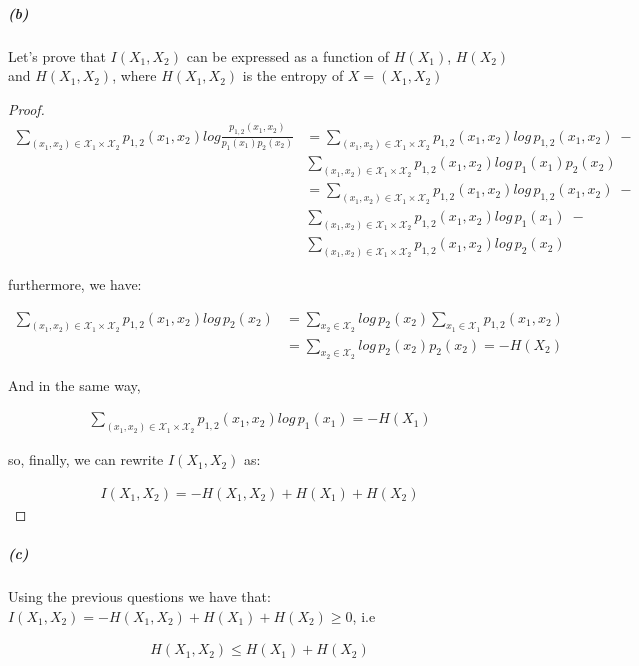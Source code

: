 \documentclass[11pt]{article}
\numberwithin{figure}{section} %
\begin{document}
\subparagraph{(b)}
Let's prove that $I(X_1, X_2)$ can be expressed as a function of $H(X_1)$, $H(X_2)$ and $H(X_1, X_2)$, where $H(X_1, X_2)$ is the entropy of $X = (X_1, X_2)$

\begin{proof}
\begin{align*}
\sum\limits_{(x_1,x_2) \in \mathcal{X}_1 \times \mathcal{X}_2} p_{1,2}(x_1,x_2) log \frac{p_{1,2}(x_1,x_2)}{p_1(x_1)p_2(x_2)} &=
\sum\limits_{(x_1,x_2) \in \mathcal{X}_1 \times \mathcal{X}_2} p_{1,2}(x_1,x_2) log \,p_{1,2}(x_1,x_2) \;- \\ 
&\sum\limits_{(x_1,x_2) \in \mathcal{X}_1 \times \mathcal{X}_2} p_{1,2}(x_1,x_2) log \,p_1(x_1)p_2(x_2) \\
&= \sum\limits_{(x_1,x_2) \in \mathcal{X}_1 \times \mathcal{X}_2} p_{1,2}(x_1,x_2) log \,p_{1,2}(x_1,x_2) \;- \\
&\sum\limits_{(x_1,x_2) \in \mathcal{X}_1 \times \mathcal{X}_2} p_{1,2}(x_1,x_2) log \,p_1(x_1) \;- \\
&\sum\limits_{(x_1,x_2) \in \mathcal{X}_1 \times \mathcal{X}_2} p_{1,2}(x_1,x_2) log \,p_2(x_2)
\end{align*}

furthermore, we have:

\begin{align*}
\sum\limits_{(x_1,x_2) \in \mathcal{X}_1 \times \mathcal{X}_2} p_{1,2}(x_1,x_2) log \,p_2(x_2) &= 
\sum\limits_{x_2 \in \mathcal{X}_2} log \,p_2(x_2) \sum\limits_{x_1 \in \mathcal{X}_1} p_{1,2}(x_1,x_2) \\
&= \sum\limits_{x_2 \in \mathcal{X}_2} log \,p_2(x_2) p_{2}(x_2) = -H(X_2)
\end{align*}

And in the same way,

\begin{align*}
\sum\limits_{(x_1,x_2) \in \mathcal{X}_1 \times \mathcal{X}_2} p_{1,2}(x_1,x_2) log \,p_1(x_1) = -H(X_1)
\end{align*}

so, finally, we can rewrite $I(X_1, X_2)$ as:

\begin{align*}
I(X_1, X_2) = - H(X_1, X_2) + H(X_1) + H(X_2)
\end{align*}
\end{proof}

\subparagraph{(c)}
Using the previous questions we have that: $I(X_1, X_2) = - H(X_1, X_2) + H(X_1) + H(X_2) \geq 0$, i.e

\begin{align*}
H(X_1, X_2) \leq H(X_1) + H(X_2)
\end{align*}
\end{document}
